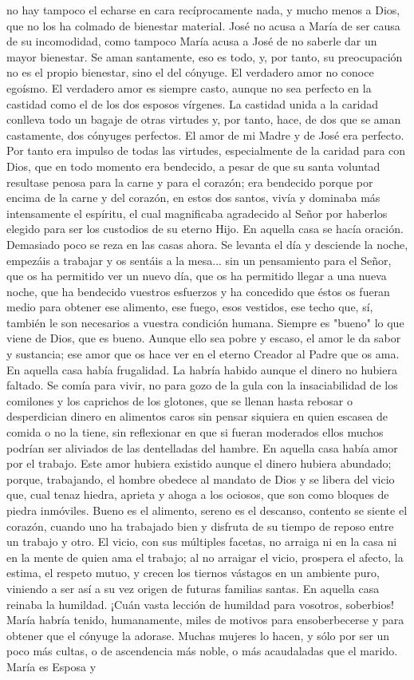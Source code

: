 \documentclass[12pt, twoside, openright]{book} %
\begin{document}
no hay tampoco el echarse en cara recíprocamente nada, y mucho menos a Dios, que no los ha colmado de bienestar material. José no acusa a María de ser causa de su incomodidad, como tampoco María acusa a José de no saberle dar un mayor bienestar. Se aman santamente, eso es todo, y, por tanto, su preocupación no es el propio bienestar, sino el del cónyuge. El verdadero amor no conoce egoísmo. El verdadero amor es siempre casto, aunque no sea perfecto en la castidad como el de los dos esposos vírgenes. La castidad unida a la caridad conlleva todo un bagaje de otras virtudes y, por tanto, hace, de dos que se aman castamente, dos cónyuges perfectos. El amor de mi Madre y de José era perfecto. Por tanto era impulso de todas las virtudes, especialmente de la caridad para con Dios, que en todo momento era bendecido, a pesar de que su santa voluntad resultase penosa para la carne y para el corazón; era bendecido porque por encima de la carne y del corazón, en estos dos santos, vivía y dominaba más intensamente el espíritu, el cual magnificaba agradecido al Señor por haberlos elegido para ser los custodios de su eterno Hijo. En aquella casa se hacía oración. Demasiado poco se reza en las casas ahora. Se levanta el día y desciende la noche, empezáis a trabajar y os sentáis a la mesa... sin un pensamiento para el Señor, que os ha permitido ver un nuevo día, que os ha permitido llegar a una nueva noche, que ha bendecido vuestros esfuerzos y ha concedido que éstos os fueran medio para obtener ese alimento, ese fuego, esos vestidos, ese techo que, sí, también le son necesarios a vuestra condición humana. Siempre es "bueno" lo que viene de Dios, que es bueno. Aunque ello sea pobre y escaso, el amor le da sabor y sustancia; ese amor que os hace ver en el eterno Creador al Padre que os ama. En aquella casa había frugalidad. La habría habido aunque el dinero no hubiera faltado. Se comía para vivir, no para gozo de la gula con la insaciabilidad de los comilones y los caprichos de los glotones, que se llenan hasta rebosar o desperdician dinero en alimentos caros sin pensar siquiera en quien escasea de comida o no la tiene, sin reflexionar en que si fueran moderados ellos muchos podrían ser aliviados de las dentelladas del hambre. En aquella casa había amor por el trabajo. Este amor hubiera existido aunque el dinero hubiera abundado; porque, trabajando, el hombre obedece al mandato de Dios y se libera del vicio que, cual tenaz hiedra, aprieta y ahoga a los ociosos, que son como bloques de piedra inmóviles. Bueno es el alimento, sereno es el descanso, contento se siente el corazón, cuando uno ha trabajado bien y disfruta de su tiempo de reposo entre un trabajo y otro. El vicio, con sus múltiples facetas, no arraiga ni en la casa ni en la mente de quien ama el trabajo; al no arraigar el vicio, prospera el afecto, la estima, el respeto mutuo, y crecen los tiernos vástagos en un ambiente puro, viniendo a ser así a su vez origen de futuras familias santas. En aquella casa reinaba la humildad. ¡Cuán vasta lección de humildad para vosotros, soberbios! María habría tenido, humanamente, miles de motivos para ensoberbecerse y para obtener que el cónyuge la adorase. Muchas mujeres lo hacen, y sólo por ser un poco más cultas, o de ascendencia más noble, o más acaudaladas que el marido. María es Esposa y 
\end{document}
